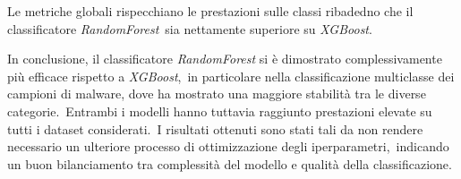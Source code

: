 \FloatBarrier

Le metriche globali rispecchiano le prestazioni sulle classi ribadedno che il classificatore \textit{RandomForest}\
sia nettamente superiore su \textit{XGBoost}.


In conclusione, il classificatore \textit{RandomForest} si è dimostrato complessivamente più efficace rispetto a \textit{XGBoost},\
in particolare nella classificazione multiclasse dei campioni di malware, dove ha mostrato una maggiore stabilità tra le diverse categorie.\
Entrambi i modelli hanno tuttavia raggiunto prestazioni elevate su tutti i dataset considerati.\
I risultati ottenuti sono stati tali da non rendere necessario un ulteriore processo di ottimizzazione degli iperparametri,\
indicando un buon bilanciamento tra complessità del modello e qualità della classificazione.
